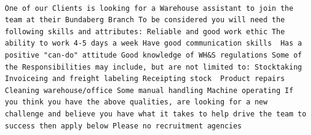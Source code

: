 \documentclass[11pt,a4paper,]{article}
\begin{document}
\begin{verbatim}
                                                                                                                                                                                                                                                                                                                                                                                                                                                                                                                                                                                                                                                                                                 One of our Clients is looking for a Warehouse assistant to join the team at their Bundaberg Branch To be considered you will need the following skills and attributes: Reliable and good work ethic The ability to work 4-5 days a week Have good communication skills  Has a positive "can-do" attitude Good knowledge of WH&S regulations Some of the Responsibilities may include, but are not limited to: Stocktaking Invoiceing and freight labeling Receipting stock  Product repairs Cleaning warehouse/office Some manual handling Machine operating If you think you have the above qualities, are looking for a new challenge and believe you have what it takes to help drive the team to success then apply below Please no recruitment agencies

\end{verbatim}
\end{document}
